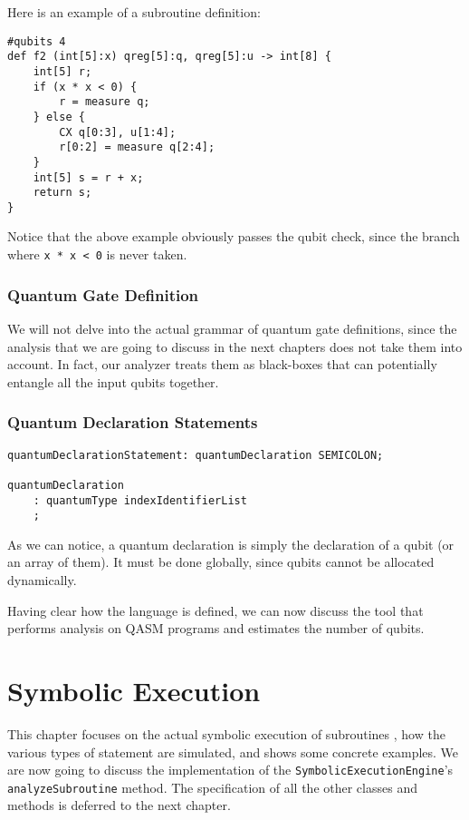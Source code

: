 \documentclass[12pt,a4paper]{report}
\theoremstyle{definition}
\theoremstyle{definition}
\theoremstyle{definition}
\begin{document}
\pagebreak

Here is an example of a subroutine definition:
\begin{lstlisting}
#qubits 4
def f2 (int[5]:x) qreg[5]:q, qreg[5]:u -> int[8] {
    int[5] r;
    if (x * x < 0) {
        r = measure q;
    } else {
        CX q[0:3], u[1:4];
        r[0:2] = measure q[2:4];
    }
    int[5] s = r + x;
    return s;
}
\end{lstlisting}

Notice that the above example obviously passes the qubit check, since the branch where \texttt{x * x < 0} is never taken.\\

\subsection{Quantum Gate Definition}
We will not delve into the actual grammar of quantum gate definitions, since the analysis that we are going to discuss in the next chapters does not take them into account. In fact, our analyzer treats them as black-boxes that can potentially entangle all the input qubits together.


\subsection{Quantum Declaration Statements}
\begin{lstlisting}
quantumDeclarationStatement: quantumDeclaration SEMICOLON;

quantumDeclaration
    : quantumType indexIdentifierList
    ;
\end{lstlisting}
As we can notice, a quantum declaration is simply the declaration of a qubit (or an array of them). It must be done globally, since qubits cannot be allocated dynamically.

Having clear how the language is defined, we can now discuss the tool that performs analysis on QASM programs and estimates the number of qubits.





\chapter{Symbolic Execution}
This chapter focuses on the actual symbolic execution of subroutines \cite{SurveySymExec-CSUR18}, how the various types of statement are simulated, and shows some concrete examples.
We are now going to discuss the implementation of the \texttt{SymbolicExecutionEngine}'s \texttt{analyzeSubroutine} method. The specification of all the other classes and methods is deferred to the next chapter.
\end{document}
